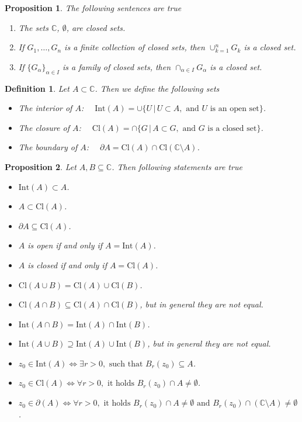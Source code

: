 \documentclass{amsart}
\newtheorem{prop}{Proposition}
\newtheorem{mydef}{Definition}
\begin{document}
\begin{prop}
The following sentences are true
\begin{enumerate}
\item The sets \(\mathbb{C}\), \(\emptyset\), are closed sets.
\item If \(G_1, \ldots, G_n\) is a finite collection of closed sets, then \(\cup_{k=1}^n G_{k}\) is a closed set.
\item If \(\{G_{\alpha}\}_{\alpha\in I}\) is a family of closed sets, then \(\cap_{\alpha\in I}G_{\alpha}\) is a closed set.
\end{enumerate}
\end{prop}


\begin{mydef}
Let \(A\subset \mathbb{C}\). Then we define the following sets
\begin{itemize}
\item The interior of \(A\): \(\quad\mbox{Int}(A) = \cup \{ U \,|\, U\subset A, \mbox{ and } U \mbox{ is an open set} \}\).
\item The closure of \(A\): \(\quad\mbox{Cl}(A) = \cap \{ G \,|\, A \subset G, \mbox{ and } G \mbox{ is a closed set} \}\).
\item The boundary of \(A\): \(\quad\partial A = \mbox{Cl}(A) \cap \mbox{Cl}\left( \mathbb{C} \setminus A\right)\).
\end{itemize}
\end{mydef}


\begin{prop}
Let \(A,B\subseteq \mathbb{C}\). Then following statements are true
\begin{itemize}
\item \(\mbox{Int}(A)\subset A\).
\item \(A \subset \mbox{Cl}(A)\).
\item \(\partial A \subseteq \mbox{Cl}(A)\).
\item \(A\) is open if and only if \(A = \mbox{Int}(A)\).
\item \(A\) is closed if and only if \(A = \mbox{Cl}(A)\).
\item \(\mbox{Cl}(A\cup B) = \mbox{Cl}(A) \cup \mbox{Cl}(B)\).
\item \(\mbox{Cl}(A\cap B) \subseteq \mbox{Cl}(A) \cap \mbox{Cl}(B)\), but in general they are not equal.
\item \(\mbox{Int}(A\cap B) = \mbox{Int}(A) \cap \mbox{Int}(B)\).
\item \(\mbox{Int}(A\cup B) \supseteq \mbox{Int}(A) \cup \mbox{Int}(B)\), but in general they are not equal.
\item \(z_0\in \mbox{Int}(A) \Leftrightarrow \exists r>0, \mbox{ such that } B_{r}(z_0)\subseteq A\).
\item \(z_0\in \mbox{Cl}(A) \Leftrightarrow \forall r>0, \mbox{ it holds } B_{r}(z_0)\cap A \neq \emptyset\).
\item \(z_0\in \partial(A) \Leftrightarrow \forall r>0, \mbox{ it holds } B_{r}(z_0)\cap A \neq \emptyset \mbox{ and } B_{r}(z_0)\cap \left(\mathbb{C} \setminus A\right)  \neq \emptyset\).
\end{itemize}
\end{prop}
\end{document}
